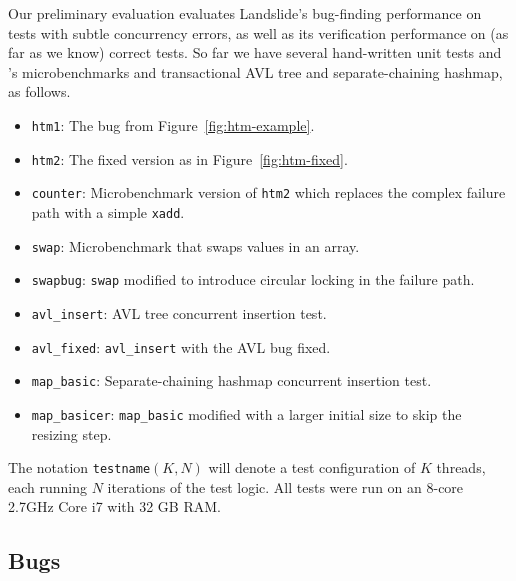 \documentclass{article}
\begin{document}
Our preliminary evaluation evaluates Landslide's bug-finding performance on tests with subtle concurrency errors,
as well as its verification performance on (as far as we know) correct tests.
So far we have several hand-written unit tests
and \cite{htm-mario}'s microbenchmarks and transactional AVL tree and separate-chaining hashmap,
as follows.

\begin{itemize}
	\item {\tt htm1}: The bug from Figure~\ref{fig:htm-example}. %
	\item {\tt htm2}: The fixed version as in Figure~\ref{fig:htm-fixed}.
	\item {\tt counter}: Microbenchmark version of {\tt htm2} which replaces the complex failure path with a simple {\tt xadd}.
	\item {\tt swap}: Microbenchmark that swaps values in an array.
	\item {\tt swapbug}: {\tt swap} modified to introduce circular locking in the failure path. %
	\item {\tt avl\_insert}: AVL tree concurrent insertion test.
	\item {\tt avl\_fixed}: {\tt avl\_insert} with the AVL bug fixed. %
	\item {\tt map\_basic}: Separate-chaining hashmap concurrent insertion test.
	\item {\tt map\_basicer}: {\tt map\_basic} modified with a larger initial size to skip the resizing step.
\end{itemize}

The notation {\tt testname}$(K,N)$ will denote a test configuration of $K$ threads, each running $N$ iterations of the test logic.
All tests were run on an 8-core 2.7GHz Core i7 with 32 GB RAM.

\subsection{Bugs}
\label{sec:bugs}
\end{document}
